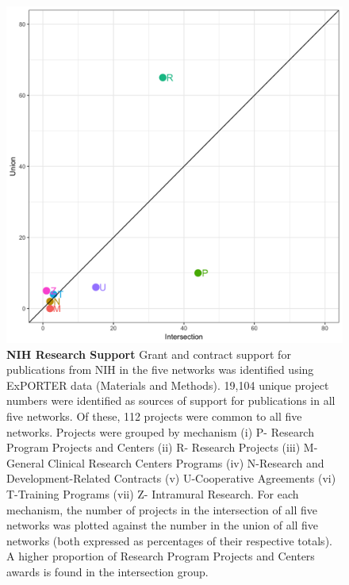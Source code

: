 \documentclass[10pt,letterpaper]{article}
\begin{document}
\begin{figure}[!h]
\begin{adjustwidth}{-0.5in}{0in} %
\centering
\includegraphics[scale=0.1]{proj_percent.png}
\caption{{\bf NIH Research Support} Grant and contract support for publications from NIH in the five networks was identified using ExPORTER data (Materials and Methods). 19,104 unique project numbers were identified as sources of support for publications in all five networks. Of these, 112 projects were common to all five networks. Projects were grouped by mechanism (i) P-  Research Program Projects and Centers (ii) R- Research Projects (iii) M-General Clinical Research Centers Programs (iv) N-Research and Development-Related Contracts (v) U-Cooperative Agreements (vi) T-Training Programs (vii) Z- Intramural Research. For each mechanism, the number of projects in the intersection of all five networks was plotted against the number in the union of all five networks (both expressed as percentages of their respective totals). A higher proportion of Research Program Projects and Centers awards is found in the intersection group.}
\label{fig3}
\end{adjustwidth}
\end{figure}
\end{document}
